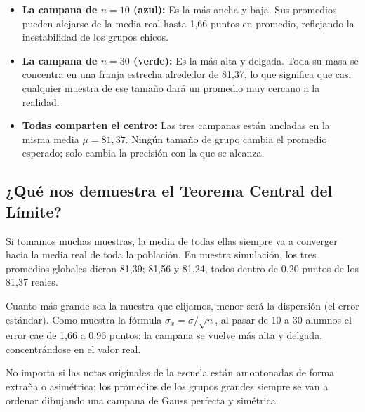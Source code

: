 \begin{itemize}
  \item \textbf{La campana de $n = 10$ (azul):} Es la más ancha y baja. Sus promedios pueden
    alejarse de la media real hasta 1,66 puntos en promedio, reflejando la inestabilidad de los
    grupos chicos.
  \item \textbf{La campana de $n = 30$ (verde):} Es la más alta y delgada. Toda su masa se
    concentra en una franja estrecha alrededor de 81,37, lo que significa que casi cualquier
    muestra de ese tamaño dará un promedio muy cercano a la realidad.
  \item \textbf{Todas comparten el centro:} Las tres campanas están ancladas en la misma media
    $\mu = 81{,}37$. Ningún tamaño de grupo cambia el promedio esperado; solo cambia la
    precisión con la que se alcanza.
\end{itemize}

\subsection{¿Qué nos demuestra el Teorema Central del Límite?}
 Si tomamos muchas muestras, la media de
todas ellas siempre va a converger hacia la media real de toda la población. En nuestra
simulación, los tres promedios globales dieron 81,39; 81,56 y 81,24, todos dentro de 0,20
puntos de los 81,37 reales.

 Cuanto más grande sea la muestra que elijamos,
menor será la dispersión (el error estándar). Como muestra la fórmula
$\sigma_{\bar{x}} = \sigma / \sqrt{n}$, al pasar de 10 a 30 alumnos el error cae de 1,66 a
0,96 puntos: la campana se vuelve más alta y delgada, concentrándose en el valor real.

 No importa si las notas originales de
la escuela están amontonadas de forma extraña o asimétrica; los promedios de los grupos grandes
siempre se van a ordenar dibujando una campana de Gauss perfecta y simétrica.



